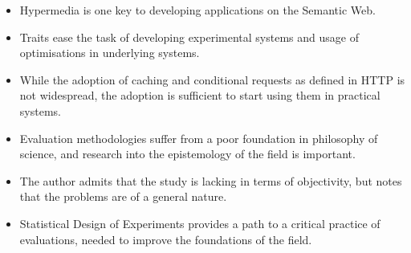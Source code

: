\begin{itemize}
\item Hypermedia is one key to developing applications on the Semantic
  Web.
\item Traits ease the task of developing experimental systems and
  usage of optimisations in underlying systems.
\item While the adoption of caching and conditional requests as defined
  in HTTP is not widespread, the adoption is sufficient to start using
  them in practical systems.
\item Evaluation methodologies suffer from a poor foundation in
  philosophy of science, and research into the epistemology of the
  field is important.
\item The author admits that the study is lacking in terms of
  objectivity, but notes that the problems are of a general nature.
\item Statistical Design of Experiments provides a path to a critical
  practice of evaluations, needed to improve the foundations of the
  field.
\end{itemize}

